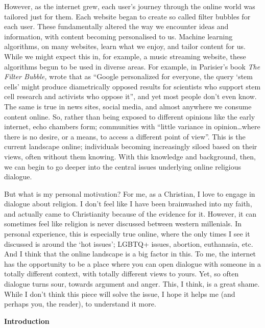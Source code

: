 \documentclass[]{article}
\begin{document}
However, as the internet grew, each user's journey through the online
world was tailored just for them. Each website began to create so called
filter bubbles for each user. These fundamentally altered the way we
encounter ideas and information, with content becoming personalised to
us. Machine learning algorithms, on many websites, learn what we enjoy,
and tailor content for us. While we might expect this in, for example, a
music streaming website, these algorithms begun to be used in diverse
areas. For example, in Parisier's book \emph{The Filter Bubble,} wrote
that as ``Google personalized for everyone, the query `stem cells' might
produce diametrically opposed results for scientists who support stem
cell research and activists who oppose
it''\autocite[pg 2]{PariserFilterBubblewhat2012}, and yet most people
don't even know. The same is true in news sites, social media, and
almost anywhere we consume content online. So, rather than being exposed
to different opinions like the early internet, echo chambers form;
communities with ``little variance in opinion\ldots{}where there is no
desire, or a means, to access a different point of
view''\autocite{Thwaitenewtheoryecho2018}. This is the current landscape
online; individuals becoming increasingly siloed based on their views,
often without them knowing. With this knowledge and background, then, we
can begin to go deeper into the central issues underlying online
religious dialogue.

But what is my personal motivation? For me, as a Christian, I love to
engage in dialogue about religion. I don't feel like I have been
brainwashed into my faith, and actually came to Christianity because of
the evidence for it. However, it can sometimes feel like religion is
never discussed between western millenials. In personal experience, this
is especially true online, where the only times I see it discussed is
around the `hot issues'; LGBTQ+ issues, abortion, euthanasia, etc. And I
think that the online landscape is a big factor in this. To me, the
internet has the opportunity to be a place where you can open dialogue
with someone in a totally different context, with totally different
views to yours. Yet, so often dialogue turns sour, towards argument and
anger. This, I think, is a great shame. While I don't think this piece
will solve the issue, I hope it helps me (and perhaps you, the reader),
to understand it more.

\newpage 

\textbf{Introduction}
\end{document}
